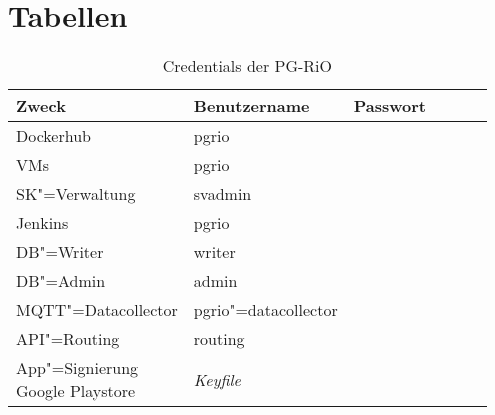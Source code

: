 
\section{Tabellen}
\begin{landscape}
	\begin{table}[htb]
	\caption{Credentials der PG-RiO}
	\begin{tabular}{|p{0.15\linewidth}|p{0.20\linewidth}|p{0.60\linewidth}|}
		\hline
		Zweck & Benutzername & Passwort \\
		\hline
		Dockerhub & pgrio & ~\newline \\
		\hline
		VMs & pgrio & ~\newline \\
		\hline
		SK"=Verwaltung & svadmin & ~\newline \\
		\hline
		Jenkins & pgrio & ~\newline \\
		\hline
		DB"=Writer & writer & ~\newline \\
		\hline
		DB"=Admin & admin & ~\newline \\
		\hline
		MQTT"=Datacollector & pgrio"=datacollector & ~\newline \\
		\hline
		API"=Routing & routing & ~\newline \\
		\hline
		App"=Signierung Google Playstore & \textit{Keyfile} & ~\newline \\
		\hline
	\end{tabular}
	\label{tbl:appendix:infrastruktur:cred}
	\end{table}
\end{landscape}

